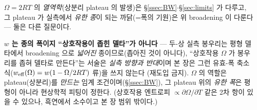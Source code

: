 $\Omega=2RT$ 의 \emph{열역학}(상분리 plateau 의 발생)은 \S\ref{ssec:BW}$\cdot$\S\ref{sec:limits} 가 다루고, 그
plateau 가 실측에서 \emph{유한 종}이 되는 까닭(=폭의 기원)은 위 broadening 이 다룬다 --- 둘은 다른 질문이다.
\begin{warnbox}
\textbf{$w$ 는 종의 폭이지 ``상호작용이 좁힌 델타''가 아니다} --- 두-상 실측 봉우리는 평형 델타에서 broadening
으로 \emph{넓어진} 종이므로(좁아진 것이 아니다), ``상호작용 $\Omega$ 가 봉우리를 좁혀 델타로 만든다''는 서술은
\emph{실측 방향과 반대}이며 본 장은 그런 유효-폭 축소식($w_{\mathrm{eff}}(\Omega)=w(1-\Omega/2RT)$ 류)을 쓰지 않는다
(재도입 금지). $\Omega$ 의 역할은 plateau(상분리)를 \emph{만드는} 임계 조건이며(\S\ref{ssec:BW}), 그 plateau
위의 \emph{유한 폭}은 평형이 아니라 현상학적 피팅이 정한다. (상호작용 엔트로피 $\propto\partial\Omega/\partial T$
같은 2차 항이 있을 수 있으나, 흑연에서 소수이고 본 장 범위 밖이다.)
\end{warnbox}

